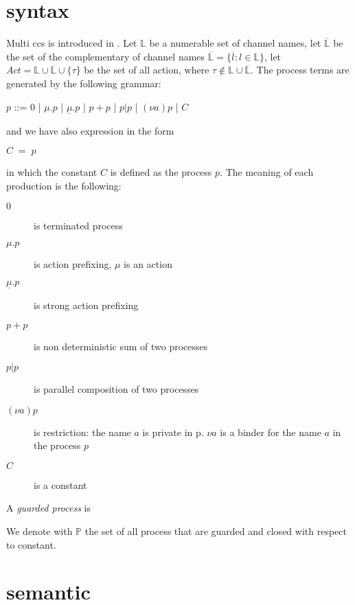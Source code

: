 

\section{syntax}

Multi ccs is introduced in \cite{gorrieriMCCS}. Let $\mathbb{L}$ be a numerable set of channel names, let $\overline{\mathbb{L}}$ be the set of the complementary of channel names $\overline{\mathbb{L}}=\{\overline{l}: l\in \mathbb{L}\}$, let $Act=\mathbb{L}\cup\overline{\mathbb{L}}\cup\{\tau\}$ be the set of all action, where $\tau \notin \mathbb{L}\cup \overline{\mathbb{L}}$. The process terms are generated by the following grammar:
\begin{center}
  $p$ ::= $0$ | $\mu.p$ | $\underline{\mu}.p$ | $p+p$ | $p|p$ | $(\nu a)p$ | $C$
\end{center}
and we have also expression in the form
\begin{center}
  $C\; =\; p$ 
\end{center}
in which the constant $C$ is defined as the process $p$.
The meaning of each production is the following:
\begin{description}
  \item[$0$] is terminated process
  \item[$\mu.p$] is action prefixing, $\mu$ is an action
  \item[$\underline{\mu}.p$] is strong action prefixing
  \item[$p+p$] is non deterministic sum of two processes
  \item[$p|p$] is parallel composition of two processes
  \item[$(\nu a)p$] is restriction: the name $a$ is private in p. $\nu a$ is a binder for the name $a$ in the process $p$
  \item[$C$] is a constant
\end{description}

\begin{definition}
\label{guarded process}
A \emph{guarded process} is 
\end{definition}


We denote with $\mathbb{P}$ the set of all process that are guarded and closed with respect to constant.



\section{semantic}


